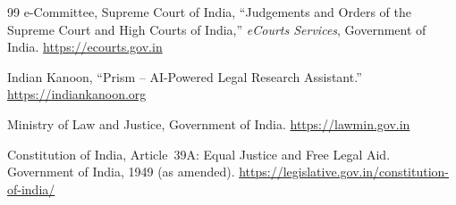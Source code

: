 \documentclass[12pt,a4paper]{article}
\begin{document}
\begin{thebibliography}{99}
e-Committee, Supreme Court of India,
``Judgements and Orders of the Supreme Court and High Courts of India,''
\textit{eCourts Services}, Government of India.
\url{https://ecourts.gov.in}

Indian Kanoon,
``Prism -- AI-Powered Legal Research Assistant.''
\url{https://indiankanoon.org}

Ministry of Law and Justice, Government of India.
\url{https://lawmin.gov.in}

Constitution of India, Article~39A: Equal Justice and Free Legal Aid.
Government of India, 1949 (as amended).
\url{https://legislative.gov.in/constitution-of-india/}

\end{thebibliography}
\end{document}
